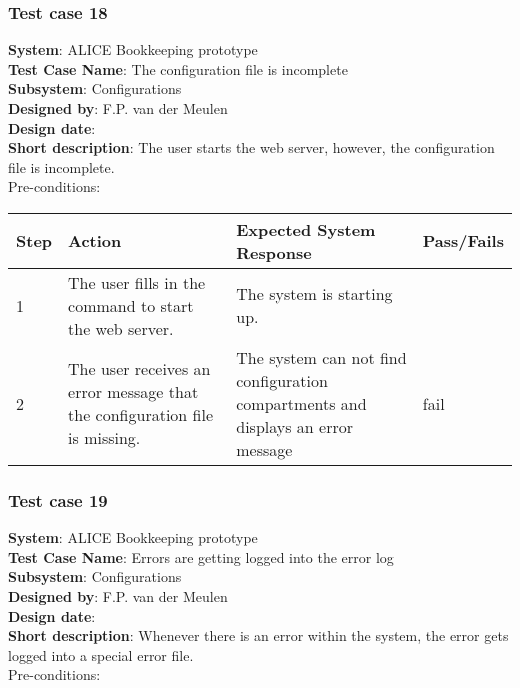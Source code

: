 \subsubsection{Test case 18}
\textbf{System}:  ALICE Bookkeeping prototype \\
\textbf{Test Case Name}:  The configuration file is incomplete \\
\textbf{Subsystem}:  Configurations \\
\textbf{Designed by}:  F.P. van der Meulen\\
\textbf{Design date}:  \\
\textbf{Short description}: The user starts the web server, however, the configuration file is incomplete. \\

Pre-conditions: \\

\begin{longtable}{ | p{0.8cm} | p{4.5cm} | p{6cm} | p{1.5cm} |}
\hline
Step & Action & Expected System Response & Pass/Fails  \\ \hline
1 & The user fills in the command to start the web server. & The system is starting up. &  \\ \hline
2 & The user receives an error message that the configuration file is missing. & The system can not find configuration compartments and displays an error message & fail\\ \hline
 
\end{longtable}

\subsubsection{Test case 19}
\textbf{System}:  ALICE Bookkeeping prototype \\
\textbf{Test Case Name}:  Errors are getting logged into the error log  \\
\textbf{Subsystem}:  Configurations \\
\textbf{Designed by}:  F.P. van der Meulen\\
\textbf{Design date}:  \\
\textbf{Short description}: Whenever there is an error within the system, the error gets logged into a special error file. \\

Pre-conditions: \\

